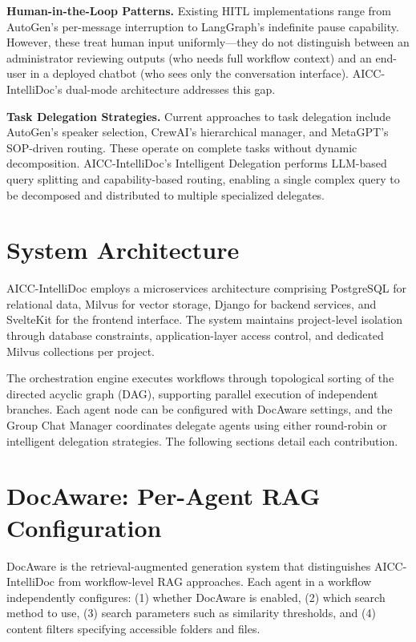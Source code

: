 \documentclass[11pt]{article}
\begin{document}
\textbf{Human-in-the-Loop Patterns.} Existing HITL implementations range from AutoGen's per-message interruption to LangGraph's indefinite pause capability. However, these treat human input uniformly—they do not distinguish between an administrator reviewing outputs (who needs full workflow context) and an end-user in a deployed chatbot (who sees only the conversation interface). AICC-IntelliDoc's dual-mode architecture addresses this gap.

\textbf{Task Delegation Strategies.} Current approaches to task delegation include AutoGen's speaker selection, CrewAI's hierarchical manager, and MetaGPT's SOP-driven routing. These operate on complete tasks without dynamic decomposition. AICC-IntelliDoc's Intelligent Delegation performs LLM-based query splitting and capability-based routing, enabling a single complex query to be decomposed and distributed to multiple specialized delegates.


\section{System Architecture}
\label{sec:architecture}

AICC-IntelliDoc employs a microservices architecture comprising PostgreSQL for relational data, Milvus for vector storage, Django for backend services, and SvelteKit for the frontend interface. The system maintains project-level isolation through database constraints, application-layer access control, and dedicated Milvus collections per project.

The orchestration engine executes workflows through topological sorting of the directed acyclic graph (DAG), supporting parallel execution of independent branches. Each agent node can be configured with DocAware settings, and the Group Chat Manager coordinates delegate agents using either round-robin or intelligent delegation strategies. The following sections detail each contribution.


\section{DocAware: Per-Agent RAG Configuration}
\label{sec:docaware}

DocAware is the retrieval-augmented generation system that distinguishes AICC-IntelliDoc from workflow-level RAG approaches. Each agent in a workflow independently configures: (1) whether DocAware is enabled, (2) which search method to use, (3) search parameters such as similarity thresholds, and (4) content filters specifying accessible folders and files.
\end{document}
